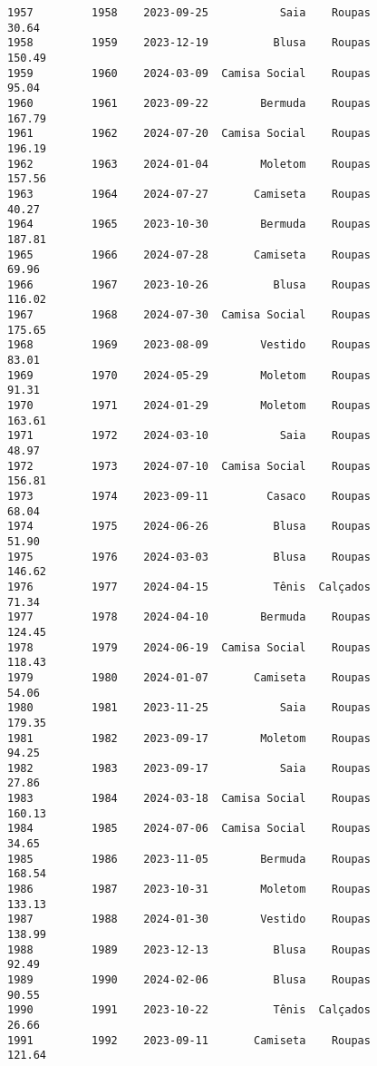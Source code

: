 \documentclass[11pt]{article}
\begin{document}
\begin{Verbatim}[commandchars=\\\{\}]
1957         1958    2023-09-25           Saia    Roupas           30.64   
1958         1959    2023-12-19          Blusa    Roupas          150.49   
1959         1960    2024-03-09  Camisa Social    Roupas           95.04   
1960         1961    2023-09-22        Bermuda    Roupas          167.79   
1961         1962    2024-07-20  Camisa Social    Roupas          196.19   
1962         1963    2024-01-04        Moletom    Roupas          157.56   
1963         1964    2024-07-27       Camiseta    Roupas           40.27   
1964         1965    2023-10-30        Bermuda    Roupas          187.81   
1965         1966    2024-07-28       Camiseta    Roupas           69.96   
1966         1967    2023-10-26          Blusa    Roupas          116.02   
1967         1968    2024-07-30  Camisa Social    Roupas          175.65   
1968         1969    2023-08-09        Vestido    Roupas           83.01   
1969         1970    2024-05-29        Moletom    Roupas           91.31   
1970         1971    2024-01-29        Moletom    Roupas          163.61   
1971         1972    2024-03-10           Saia    Roupas           48.97   
1972         1973    2024-07-10  Camisa Social    Roupas          156.81   
1973         1974    2023-09-11         Casaco    Roupas           68.04   
1974         1975    2024-06-26          Blusa    Roupas           51.90   
1975         1976    2024-03-03          Blusa    Roupas          146.62   
1976         1977    2024-04-15          Tênis  Calçados           71.34   
1977         1978    2024-04-10        Bermuda    Roupas          124.45   
1978         1979    2024-06-19  Camisa Social    Roupas          118.43   
1979         1980    2024-01-07       Camiseta    Roupas           54.06   
1980         1981    2023-11-25           Saia    Roupas          179.35   
1981         1982    2023-09-17        Moletom    Roupas           94.25   
1982         1983    2023-09-17           Saia    Roupas           27.86   
1983         1984    2024-03-18  Camisa Social    Roupas          160.13   
1984         1985    2024-07-06  Camisa Social    Roupas           34.65   
1985         1986    2023-11-05        Bermuda    Roupas          168.54   
1986         1987    2023-10-31        Moletom    Roupas          133.13   
1987         1988    2024-01-30        Vestido    Roupas          138.99   
1988         1989    2023-12-13          Blusa    Roupas           92.49   
1989         1990    2024-02-06          Blusa    Roupas           90.55   
1990         1991    2023-10-22          Tênis  Calçados           26.66   
1991         1992    2023-09-11       Camiseta    Roupas          121.64   

\end{Verbatim}
\end{document}
